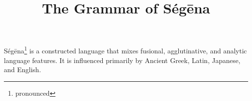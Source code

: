 \documentclass{report}
\begin{document}
\title{The Grammar of Ségēna}
\maketitle

Ségēna\footnote{pronounced \textipa{[se(;)"ge:na]}} is a constructed language
that mixes fusional, agglutinative, and analytic language features. It is
influenced primarily by Ancient Greek, Latin, Japanese, and English.

\tableofcontents




\end{document}
